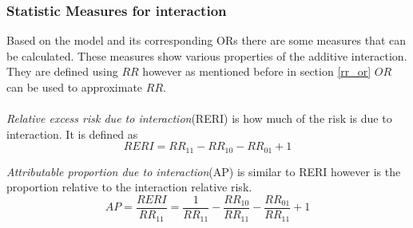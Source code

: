 \documentclass[10pt,a4paper]{report}
\begin{document}










\subsubsection{Statistic Measures for interaction}
Based on the model and its corresponding ORs there are some measures that can be calculated. These measures show various properties of the additive interaction. They are defined using $RR$ however as mentioned before in section \ref{rr_or} $OR$ can be used to approximate $RR$.\\
\\
\emph{Relative  excess risk due to interaction}(RERI) is how much of the risk is due to interaction\cite{recoding_2011}. It is defined as\cite{recoding_2011}
\begin{equation}
RERI=RR_{11}-RR_{10}-RR_{01}+1
\end{equation}

\emph{Attributable proportion due to interaction}(AP) is similar to RERI however is the proportion relative to the interaction relative risk\cite{recoding_2011}.
\begin{equation}
AP=\frac{RERI}{RR_{11}}=\frac{1}{RR_{11}}-\frac{RR_{10}}{RR_{11}}-\frac{RR_{01}}{RR_{11}}+1
\end{equation}
\end{document}
